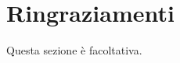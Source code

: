 \documentclass[a4paper,oneside,12pt]{book}
\title{\thesistitle}
\author{\authorname}
\begin{document}


\section*{Ringraziamenti}
Questa sezione è facoltativa.
\newpage 

\linespread{3.5}
\onehalfspacing
\tableofcontents
\newpage

\mainmatter




\nocite{*} %


\end{document}
